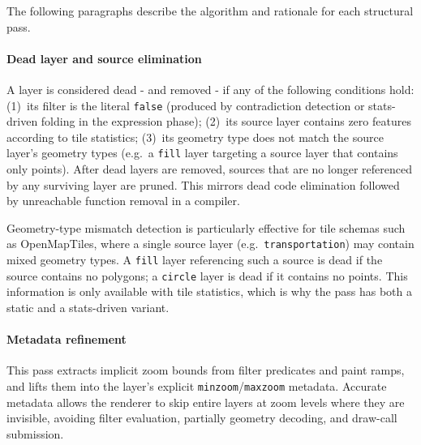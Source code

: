 The following paragraphs describe the algorithm and rationale for each structural pass.

\paragraph{Dead layer and source elimination}
A layer is considered dead - and removed - if any of the following conditions hold:
(1)~its filter is the literal \texttt{false} (produced by contradiction detection or stats-driven folding in the expression phase);
(2)~its source layer contains zero features according to tile statistics;
(3)~its geometry type does not match the source layer's geometry types (e.g.\ a \texttt{fill} layer targeting a source layer that contains only points).
After dead layers are removed, sources that are no longer referenced by any surviving layer are pruned.
This mirrors dead code elimination followed by unreachable function removal in a compiler.

Geometry-type mismatch detection is particularly effective for tile schemas such as OpenMapTiles, where a single source layer (e.g.\ \texttt{transportation}) may contain mixed geometry types.
A \texttt{fill} layer referencing such a source is dead if the source contains no polygons; a \texttt{circle} layer is dead if it contains no points.
This information is only available with tile statistics, which is why the pass has both a static and a stats-driven variant.

\paragraph{Metadata refinement}
This pass extracts implicit zoom bounds from filter predicates and paint ramps, and lifts them into the layer's explicit \texttt{minzoom}/\texttt{maxzoom} metadata.
Accurate metadata allows the renderer to skip entire layers at zoom levels where they are invisible, avoiding filter evaluation, partially geometry decoding, and draw-call submission.

